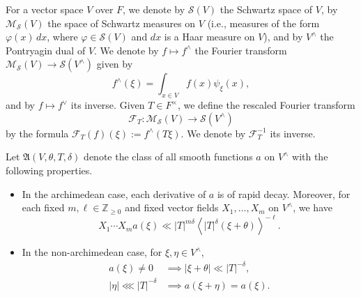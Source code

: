For a vector space $V$ over $F$, we denote by $\mathcal{S}(V)$ the Schwartz space of $V$, by $\mathcal{M}_{\mathcal{S}}(V)$ the space of Schwartz measures on $V$ (i.e., measures of the form $\varphi(x) \, d x$, where $\varphi \in \mathcal{S}(V)$ and $d x$ is a Haar measure on $V$), and by $V^\wedge$ the Pontryagin dual of $V$.  We denote by $f \mapsto f^\wedge$ the Fourier transform $\mathcal{M}_{\mathcal{S}}(V) \rightarrow \mathcal{S}(V^\wedge)$ given by
\begin{equation*}
  f^\wedge(\xi) = \int_{x \in V} f(x) \psi_\xi(x),
\end{equation*}
and by $f \mapsto f^\vee$ its inverse.  Given $T \in F^\times$, we define the rescaled Fourier transform
\begin{equation*}
  \mathcal{F}_T : \mathcal{M}_{\mathcal{S}}(V) \rightarrow \mathcal{S}(V^\wedge)
\end{equation*}
by the formula $\mathcal{F}_T(f)(\xi) := f^\wedge(T \xi)$.  We denote by $\mathcal{F}_T^{-1}$ its inverse.


\begin{definition}\label{defn:let-mathfrakav-theta}
  Let $\mathfrak{A}(V,\theta,T,\delta)$ denote the class of all smooth functions $a$ on $V^\wedge$ with the following properties.
  \begin{itemize}
  \item In the archimedean case, each derivative of $a$ is of rapid decay.  Moreover, for each fixed $m, \ell \in \mathbb{Z}_{\geq 0}$ and fixed vector fields $X_1,\dotsc,X_m$ on $V^\wedge$, we have
    \begin{equation*}
      X_1 \dotsb X_m a(\xi) \ll |T|^{m \delta} \left\langle |T|^{\delta} (\xi + \theta ) \right\rangle^{-\ell}.
    \end{equation*}
  \item In the non-archimedean case, for $\xi, \eta \in V^\wedge$,
    \begin{align*}
      a(\xi ) \neq 0 &\implies |\xi + \theta| \ll |T|^{-\delta}, \\
      |\eta| \lll |T|^{-\delta} &\implies a(\xi + \eta  ) = a(\xi).
    \end{align*}
  \end{itemize}
\end{definition}

